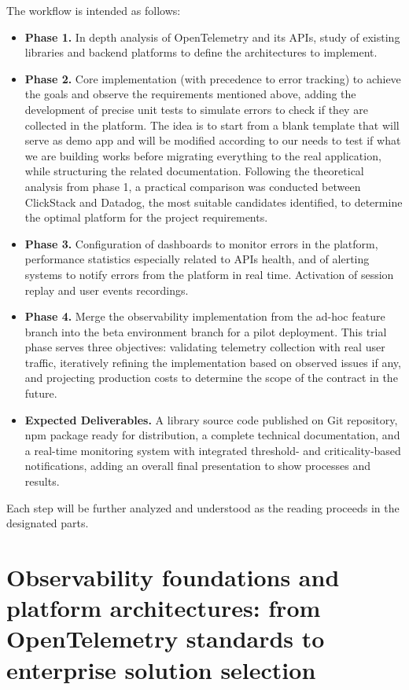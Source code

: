 \documentclass[12pt,a4paper,openright,twoside]{book}
\begin{document}
The workflow is intended as follows:
\begin{itemize}[nosep]
    \item \textbf{Phase 1.} In depth analysis of OpenTelemetry and its APIs, study of existing libraries and backend platforms to define the architectures to implement.
    \item \textbf{Phase 2.} Core implementation (with precedence to error tracking) to achieve the goals and observe the requirements mentioned above, adding the development of precise unit tests to simulate errors to check if they are collected in the platform. The idea is to start from a blank template that will serve as demo app and will be modified according to our needs to test if what we are building works before migrating everything to the real application, while structuring the related documentation. Following the theoretical analysis from phase 1, a practical comparison was conducted between ClickStack and Datadog, the most suitable candidates identified, to determine the optimal platform for the project requirements.
    \item \textbf{Phase 3.} Configuration of dashboards to monitor errors in the platform, performance statistics especially related to APIs health, and of alerting systems to notify errors from the platform in real time. Activation of session replay and user events recordings.
    \item \textbf{Phase 4.} Merge the observability implementation from the ad-hoc feature branch into the beta environment branch for a pilot deployment. This trial phase serves three objectives: validating telemetry collection with real user traffic, iteratively refining the implementation based on observed issues if any, and projecting production costs to determine the scope of the contract in the future. 
    \item \textbf{Expected Deliverables.} A library source code published on Git repository, npm package ready for distribution, a complete technical documentation, and a real-time monitoring system with integrated threshold- and criticality-based notifications, adding an overall final presentation to show processes and results.
\end{itemize}

Each step will be further analyzed and understood as the reading proceeds in the designated parts. 

\chapter{Observability foundations and platform architectures: from OpenTelemetry standards to enterprise solution selection}
\end{document}

